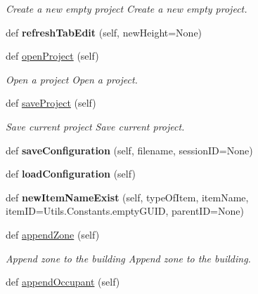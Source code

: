 \begin{DoxyCompactItemize}
\begin{DoxyCompactList}\small\item\em Create a new empty project Create a new empty project. \end{DoxyCompactList}\item 
\mbox{\label{class_no_m_a_s_s___g_u_i_1_1_app_a5cb14c4329f786880ab70733cecf476c}} 
def {\bfseries refresh\+Tab\+Edit} (self, new\+Height=None)
\item 
def \hyperlink{class_no_m_a_s_s___g_u_i_1_1_app_a8027378f2d626f57d5832362b5712104}{open\+Project} (self)
\begin{DoxyCompactList}\small\item\em Open a project Open a project. \end{DoxyCompactList}\item 
def \hyperlink{class_no_m_a_s_s___g_u_i_1_1_app_a292a02cccaabec778b1dd648ac0aa146}{save\+Project} (self)
\begin{DoxyCompactList}\small\item\em Save current project Save current project. \end{DoxyCompactList}\item 
\mbox{\label{class_no_m_a_s_s___g_u_i_1_1_app_ae3054086b72ee2f16401c9a937097cee}} 
def {\bfseries save\+Configuration} (self, filename, session\+ID=None)
\item 
\mbox{\label{class_no_m_a_s_s___g_u_i_1_1_app_a04cdefa5522f7ae519cb2ad4706fd512}} 
def {\bfseries load\+Configuration} (self)
\item 
\mbox{\label{class_no_m_a_s_s___g_u_i_1_1_app_a7422ba70e9fcbc9b798938ed1efdff3e}} 
def {\bfseries new\+Item\+Name\+Exist} (self, type\+Of\+Item, item\+Name, item\+ID=Utils.\+Constants.\+empty\+G\+U\+ID, parent\+ID=None)
\item 
def \hyperlink{class_no_m_a_s_s___g_u_i_1_1_app_ac2d16e447b5b9993ed91579a3285deff}{append\+Zone} (self)
\begin{DoxyCompactList}\small\item\em Append zone to the building Append zone to the building. \end{DoxyCompactList}\item 
def \hyperlink{class_no_m_a_s_s___g_u_i_1_1_app_a673849f77e1dc7b5f6ada8645b651f97}{append\+Occupant} (self)

\end{DoxyCompactItemize}
